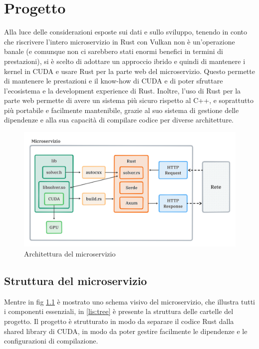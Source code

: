 \chapter{Progetto}
\label{sec:arch}

Alla luce delle considerazioni esposte sui dati e sullo sviluppo, tenendo in conto che riscrivere l'intero microservizio in Rust con Vulkan non è un'operazione banale (e comunque non ci sarebbero stati enormi benefici in termini di prestazioni), si è scelto di adottare un approccio ibrido e quindi di mantenere i kernel in CUDA e usare Rust per la parte web del microservizio. Questo permette di mantenere le prestazioni e il know-how di CUDA e di poter sfruttare l'ecosistema e la development experience di Rust. Inoltre, l'uso di Rust per la parte web permette di avere un sistema più sicuro rispetto al  C++, e soprattutto più portabile e facilmente mantenibile, grazie al suo sistema di gestione delle dipendenze e alla sua capacità di compilare codice per diverse architetture.

\begin{figure}[ht]
    \centering
    \includegraphics[width=.94\linewidth]{images/chapter6/micro_arch.png}
    \caption{Architettura del microservizio}
    \label{fig:micro_arch}
\end{figure}

\section{Struttura del microservizio}

Mentre in fig \ref{fig:micro_arch} è mostrato uno schema visivo del microservizio, che illustra tutti i componenti essenziali, in \ref{lis:tree} è presente la struttura delle cartelle del progetto. Il progetto è strutturato in modo da separare il codice Rust dalla shared library di CUDA, in modo da poter gestire facilmente le dipendenze e le configurazioni di compilazione. 


